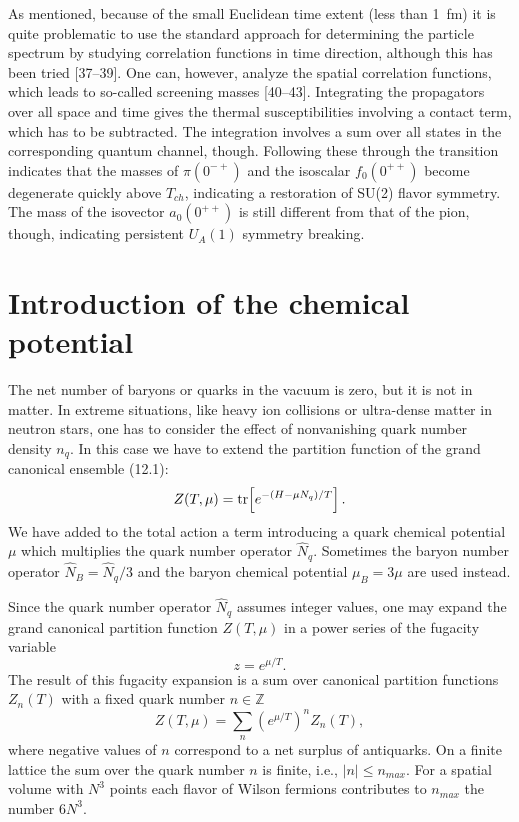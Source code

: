 As mentioned, because of the small Euclidean time extent (less than 1~fm) it is
quite problematic to use the standard approach for determining the particle
spectrum by studying correlation functions in time direction, although this has
been tried [37--39]. One can, however, analyze the spatial correlation
functions, which leads to so-called screening masses [40--43]. Integrating the
propagators over all space and time gives the thermal susceptibilities
involving a contact term, which has to be subtracted. The integration involves
a sum over all states in the corresponding quantum channel, though. Following
these through the transition indicates that the masses of $\pi(0^{-+})$ and the
isoscalar $f_0(0^{++})$ become degenerate quickly above $T_{ch}$, indicating a
restoration of SU(2) flavor symmetry. The mass of the isovector $a_0(0^{++})$
is still different from that of the pion, though, indicating persistent
$U_A(1)$ symmetry breaking.

\section{Introduction of the chemical potential}

The net number of baryons or quarks in the vacuum is zero, but it is not in
matter. In extreme situations, like heavy ion collisions or ultra-dense matter
in neutron stars, one has to consider the effect of nonvanishing quark number
density $n_q$. In this case we have to extend the partition function of the
grand canonical ensemble (12.1):
\begin{equation}
  Z(T,\mu) = \operatorname{tr}\!\left[e^{-(H - \mu N_q)/T}\right].
\end{equation}
We have added to the total action a term introducing a quark chemical potential
$\mu$ which multiplies the quark number operator $\hat{N}_q$. Sometimes the
baryon number operator $\hat{N}_B = \hat{N}_q/3$ and the baryon chemical
potential $\mu_B = 3\mu$ are used instead.

Since the quark number operator $\hat{N}_q$ assumes integer values, one may
expand the grand canonical partition function $Z(T,\mu)$ in a power series of
the fugacity variable
\begin{equation}
  z = e^{\mu/T}.
\end{equation}
The result of this fugacity expansion is a sum over canonical partition
functions $Z_n(T)$ with a fixed quark number $n \in \mathbb{Z}$
\begin{equation}
  Z(T,\mu) = \sum_n \left(e^{\mu/T}\right)^n Z_n(T),
\end{equation}
where negative values of $n$ correspond to a net surplus of antiquarks. On a
finite lattice the sum over the quark number $n$ is finite, i.e.,
$|n| \le n_{max}$. For a spatial volume with $N^3$ points each flavor of Wilson
fermions contributes to $n_{max}$ the number $6N^3$.

